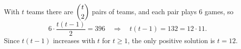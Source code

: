 With $t$ teams there are $\dbinom t2$ pairs of teams, and each pair plays $6$ games, so
\[6\cdot\dfrac{t(t-1)}{2}=396\quad\Longrightarrow\quad t(t-1)=132=12\cdot11 .\]
Since $t(t-1)$ increases with $t$ for $t\ge1$, the only positive solution is $t=\boxed{12}$.
